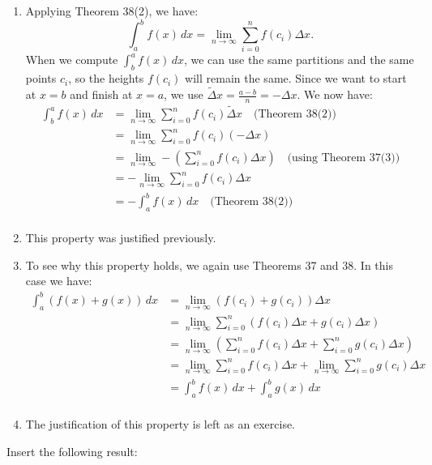 \documentclass[11pt]{report}
\begin{document}
\begin{enumerate}
{\begin{enumerate}
\item Applying Theorem 38(2), we have: \[\int_a^b f(x)\,dx=\lim_{n\to\infty}\sum_{i=0}^n f(c_i)\Delta x.\] When we compute $\int_b^a f(x)\,dx$, we can use the same partitions and the same points $c_i$, so the heights $f(c_i)$ will remain the same. Since we want to start at $x=b$ and finish at $x=a$, we use $\widetilde\Delta x=\frac{a-b}n=-\Delta x$. We now have:
\begin{equation*}
\begin{split}
\int_b^a f(x)\,dx &=\lim_{n\to\infty} \sum_{i=0}^n f(c_i)\widetilde\Delta x\quad\text{(Theorem 38(2))}\\
&=\lim_{n\to\infty} \sum_{i=0}^n f(c_i)(-\Delta x)\\
&=\lim_{n\to\infty} -\left(\sum_{i=0}^n f(c_i)\Delta x\right) \quad\text{(using Theorem 37(3))}\\
&=-\lim_{n\to\infty} \sum_{i=0}^n f(c_i)\Delta x\\
&=-\int_a^b f(x)\,dx \quad\text{(Theorem 38(2))}\\
\end{split}
\end{equation*}

\item This property was justified previously.

\item To see why this property holds, we again use Theorems 37 and 38. In this case we have:
\begin{equation*}
\begin{split}
\int_a^b(f(x)+g(x))\,dx&=\lim_{n\to\infty}(f(c_i)+g(c_i))\Delta x\\
&=\lim_{n\to\infty} \sum_{i=0}^n (f(c_i)\Delta x+g(c_i)\Delta x)\\
&=\lim_{n\to\infty}\left(\sum_{i=0}^n f(c_i)\Delta x +\sum_{i=0}^n g(c_i)\Delta x\right)\\
&=\lim_{n\to\infty}\sum_{i=0}^n f(c_i)\Delta x +\lim_{n\to\infty}\sum_{i=0}^n g(c_i)\Delta x\\
&=\int_a^b f(x)\,dx+\int_a^bg(x)\,dx\\
\end{split}
\end{equation*}

\item The justification of this property is left as an exercise.

\end{enumerate}

\item Insert the following result:

}
\end{enumerate}
\end{document}
